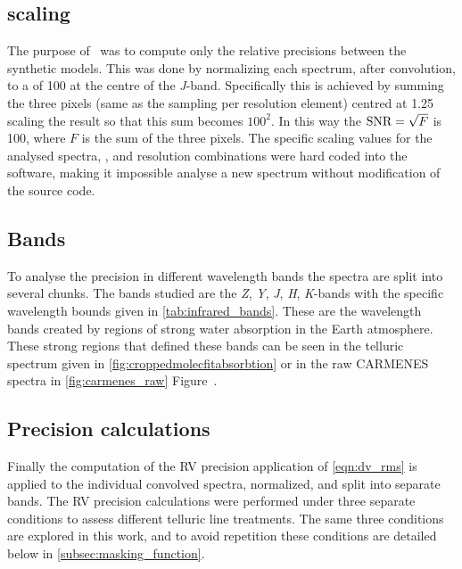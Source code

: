 \subsection{\snr{} scaling}
\label{subsec:orginal_snr_scaling}
The purpose of~\citet{figueira_radial_2016} was to compute only the relative precisions between the synthetic models.
This was done by normalizing each spectrum, after convolution, to a \snr{} of 100 at the centre of the \emph{J}-band.
Specifically this is achieved by summing the three pixels (same as the sampling per resolution element) centred at 1.25\um{} scaling the result so that this sum becomes \(100^2\).
In this way the \(\textrm{SNR}{} =\sqrt{F}\) is 100, where \(F\) is the sum of the three pixels.
The specific scaling values for the analysed spectra, \Vsini{}, and resolution combinations were hard coded into the software, making it impossible analyse a new spectrum without modification of the source code.

\subsection{Bands}
\label{subsec:orginal_bands}
To analyse the precision in different wavelength bands the spectra are split into several chunks.
The bands studied are the \emph{Z}, \emph{Y}, \emph{J}, \emph{H}, \emph{K}-bands with the specific wavelength bounds given in \cref{tab:infrared_bands}.
These are the \nir{} wavelength bands created by regions of strong water absorption in the Earth atmosphere.
These strong  regions that defined these bands can be seen in the telluric spectrum given in \cref{fig:croppedmolecfitabsorbtion} or in the raw {CARMENES} spectra in \cref{fig:carmenes_raw} Figure~.

\subsection{Precision calculations}
\label{subsec:orginal_rv_calc}
Finally the computation of the {RV} precision application of \cref{eqn:dv_rms} is applied to the individual convolved spectra, normalized, and split into separate bands.
The {RV} precision calculations were performed under three separate conditions to assess different telluric line treatments.
The same three conditions are explored in this work, and to avoid repetition these conditions are detailed below in \cref{subsec:masking_function}.
